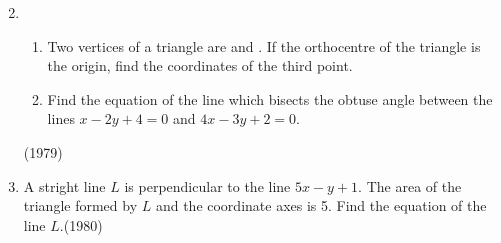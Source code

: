 \begin{enumerate}
\begin{multicols}{4}
\begin{enumerate}
\end{enumerate}
\end{multicols}
\item                    	
	\begin{enumerate}
             \item  Two vertices of a triangle are  and . If the orthocentre of the triangle is the origin, find the coordinates of the third point.
	     \item  Find the equation of the line which bisects the obtuse angle between  the lines $x-2y+4=0$ and $4x-3y+2=0$.
         \end{enumerate}\hfill{(1979)}

\item A stright line $L$ is perpendicular to the line $5x-y+1$. The area of the triangle formed by $L$ and the coordinate axes is 5. Find the equation of the line $L$.\hfill{(1980)}


\end{enumerate}
